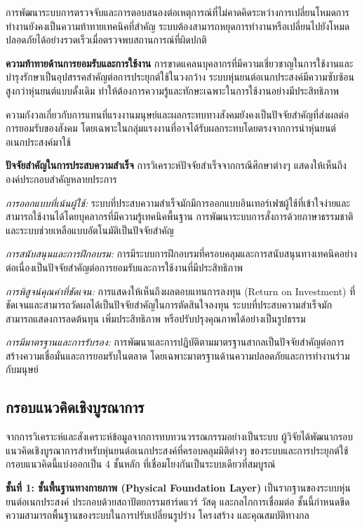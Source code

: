 \documentclass[a4paper]{article}
\begin{document}
การพัฒนาระบบการตรวจจับและการตอบสนองต่อเหตุการณ์ที่ไม่คาดคิดระหว่างการเปลี่ยนโหมดการทำงานยังคงเป็นความท้าทายเทคนิคที่สำคัญ ระบบต้องสามารถหยุดการทำงานหรือเปลี่ยนไปยังโหมดปลอดภัยได้อย่างรวดเร็วเมื่อตรวจพบสถานการณ์ที่ผิดปกติ

\textbf{ความท้าทายด้านการยอมรับและการใช้งาน} การขาดแคลนบุคลากรที่มีความเชี่ยวชาญในการใช้งานและบำรุงรักษาเป็นอุปสรรคสำคัญต่อการประยุกต์ใช้ในวงกว้าง ระบบหุ่นยนต์อเนกประสงค์มีความซับซ้อนสูงกว่าหุ่นยนต์แบบดั้งเดิม ทำให้ต้องการความรู้และทักษะเฉพาะในการใช้งานอย่างมีประสิทธิภาพ

ความกังวลเกี่ยวกับการแทนที่แรงงานมนุษย์และผลกระทบทางสังคมยังคงเป็นปัจจัยสำคัญที่ส่งผลต่อการยอมรับของสังคม โดยเฉพาะในกลุ่มแรงงานที่อาจได้รับผลกระทบโดยตรงจากการนำหุ่นยนต์อเนกประสงค์มาใช้

\textbf{ปัจจัยสำคัญในการประสบความสำเร็จ} การวิเคราะห์ปัจจัยสำเร็จจากกรณีศึกษาต่างๆ แสดงให้เห็นถึงองค์ประกอบสำคัญหลายประการ

\textit{การออกแบบที่เน้นผู้ใช้:} ระบบที่ประสบความสำเร็จมักมีการออกแบบอินเทอร์เฟซผู้ใช้ที่เข้าใจง่ายและสามารถใช้งานได้โดยบุคลากรที่มีความรู้เทคนิคพื้นฐาน การพัฒนาระบบการสั่งการด้วยภาษาธรรมชาติและระบบช่วยเหลือแบบอัตโนมัติเป็นปัจจัยสำคัญ

\textit{การสนับสนุนและการฝึกอบรม:} การมีระบบการฝึกอบรมที่ครอบคลุมและการสนับสนุนทางเทคนิคอย่างต่อเนื่องเป็นปัจจัยสำคัญต่อการยอมรับและการใช้งานที่มีประสิทธิภาพ

\textit{การพิสูจน์คุณค่าที่ชัดเจน:} การแสดงให้เห็นถึงผลตอบแทนการลงทุน (Return on Investment) ที่ชัดเจนและสามารถวัดผลได้เป็นปัจจัยสำคัญในการตัดสินใจลงทุน ระบบที่ประสบความสำเร็จมักสามารถแสดงการลดต้นทุน เพิ่มประสิทธิภาพ หรือปรับปรุงคุณภาพได้อย่างเป็นรูปธรรม

\textit{การมีมาตรฐานและการรับรอง:} การพัฒนาและการปฏิบัติตามมาตรฐานสากลเป็นปัจจัยสำคัญต่อการสร้างความเชื่อมั่นและการยอมรับในตลาด โดยเฉพาะมาตรฐานด้านความปลอดภัยและการทำงานร่วมกับมนุษย์

\subsection{กรอบแนวคิดเชิงบูรณาการ}

จากการวิเคราะห์และสังเคราะห์ข้อมูลจากการทบทวนวรรณกรรมอย่างเป็นระบบ ผู้วิจัยได้พัฒนากรอบแนวคิดเชิงบูรณาการสำหรับหุ่นยนต์อเนกประสงค์ที่ครอบคลุมมิติต่างๆ ของระบบและการประยุกต์ใช้ กรอบแนวคิดนี้แบ่งออกเป็น 4 ชั้นหลัก ที่เชื่อมโยงกันเป็นระบบเดียวที่สมบูรณ์

\textbf{ชั้นที่ 1: ชั้นพื้นฐานทางกายภาพ (Physical Foundation Layer)} เป็นรากฐานของระบบหุ่นยนต์อเนกประสงค์ ประกอบด้วยสถาปัตยกรรมฮาร์ดแวร์ วัสดุ และกลไกการเชื่อมต่อ ชั้นนี้กำหนดขีดความสามารถพื้นฐานของระบบในการปรับเปลี่ยนรูปร่าง โครงสร้าง และคุณสมบัติทางกล
\end{document}
